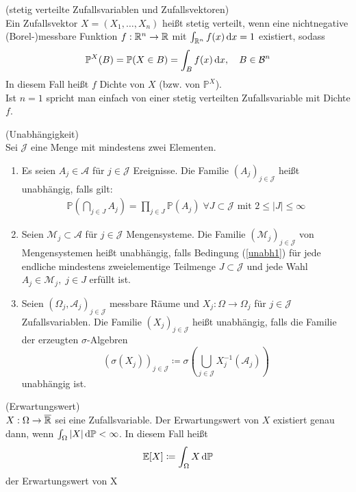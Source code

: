 \begin{Definition}(stetig verteilte Zufallsvariablen und Zufallsvektoren)\\
	Ein Zufallsvektor $ X = (X_1,\dots,X_n) $ heißt stetig verteilt, wenn eine nichtnegative (Borel-)messbare Funktion $ f : \mathbb{R}^n \to \mathbb{R} $ mit $ \int_{\mathbb{R}^n} f(x) \, \mathrm{d} x =1  $ existiert, sodass 
	\[
		\mathbb{P}^X(B) = \mathbb{P}(X \in B) =  \int_{B} f(x) \, \mathrm{d} x, \quad B \in \mathcal{B}^n
	\]
	In diesem Fall heißt $ f $ Dichte von $ X $ (bzw. von $ \mathbb{P}^X $).\\
	Ist $ n=1 $ spricht man einfach von einer stetig verteilten Zufallsvariable mit Dichte $ f $.
	
\end{Definition}

\begin{Definition}(Unabhängigkeit)\\
	Sei $ \mathcal{J} $ eine Menge mit mindestens zwei Elementen.
	\begin{enumerate}[label=(\alph*)]
		\item Es seien $ A_j \in \mathcal{A}$ für $ j \in \mathcal{J} $ Ereignisse. Die Familie $ (A_j)_{j \in \mathcal{J}} $ heißt unabhängig, falls gilt:
		\begin{align}
			\label{unabh1}
			\mathbb{P}\left( \bigcap_{j \in J} A_j \right) = \prod_{j \in J} \mathbb{P}(A_j) \; \forall J \subset\mathcal{J} \text{ mit } 2\leq|J|\leq\infty
		\end{align}
		\item Seien $ \mathcal{M}_j \subset \mathcal{A} $ für $ j \in \mathcal{J} $ Mengensysteme. Die Familie $ (\mathcal{M}_j)_{j \in \mathcal{J}} $ von Mengensystemen heißt unabhängig, falls Bedingung (\ref{unabh1}) für jede endliche mindestens zweielementige Teilmenge $ J \subset \mathcal{J} $ und jede Wahl $ A_j \in \mathcal{M}_j, \; j \in J $ erfüllt ist.
		\item Seien $ (\Omega_j,\mathcal{A}_j)_{j \in \mathcal{J}} $ messbare Räume und $ X_j : \Omega \to \Omega_j $ für $ j \in \mathcal{J} $ Zufallsvariablen.
		Die Familie $ (X_j)_{j \in \mathcal{J}} $ heißt unabhängig, falls die Familie der erzeugten $ \sigma $-Algebren \[ (\sigma(X_j))_{j \in \mathcal{J}} \coloneqq \sigma \left(\bigcup_{j \in \mathcal{J}} X_j^{-1}(\mathcal{A}_j) \right) \] unabhängig ist.
	\end{enumerate}	
\end{Definition} 
\begin{Definition}(Erwartungswert)\\
	$ X:\Omega \to \overline{\mathbb{R}} $ sei eine Zufallsvariable.
	Der Erwartungswert von $ X $ existiert genau dann, wenn $ \int_{\Omega} |X| \, \mathrm{d} \mathbb{P} < \infty $. In diesem Fall heißt
	\begin{align*}
	\mathbb{E}[X] \coloneqq \int_{\Omega} X \, \mathrm{d} \mathbb{P} 
	\end{align*}
	der Erwartungswert von X
\end{Definition}

